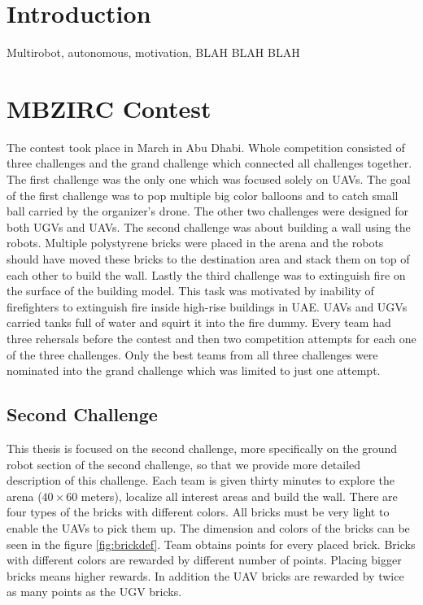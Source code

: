 \section{Introduction}
Multirobot, autonomous, motivation, BLAH BLAH BLAH


\section{MBZIRC Contest}
The contest took place in March in Abu Dhabi. Whole competition consisted of three challenges and the grand challenge which connected all challenges together. The first challenge was the only one which was focused solely on UAVs. The goal of the first challenge was to pop multiple big color balloons and to catch small ball carried by the organizer's drone. The other two challenges were designed for both UGVs and UAVs. The second challenge was about building a wall using the robots. Multiple polystyrene bricks were placed in the arena and the robots should have moved these bricks to the destination area and stack them on top of each other to build the wall. Lastly the third challenge was to extinguish fire on the surface of the building model. This task was motivated by inability of firefighters to extinguish fire inside high-rise buildings in UAE. UAVs and UGVs carried tanks full of water and squirt it into the fire dummy. Every team had three rehersals before the contest and then two competition attempts for each one of the three challenges. Only the best teams from all three challenges were nominated into the grand challenge which was limited to just one attempt.

\subsection{Second Challenge}
This thesis is focused on the second challenge, more specifically on the ground robot section of the second challenge, so that we provide more detailed description of this challenge. Each team is given thirty minutes to explore the arena ($40 \times 60$ meters), localize all interest areas and build the wall. There are four types of the bricks with different colors. All bricks must be very light to enable the UAVs to pick them up. The dimension and colors of the bricks can be seen in the figure \ref{fig:brickdef}. Team obtains points for every placed brick. Bricks with different colors are rewarded by different number of points. Placing bigger bricks means higher rewards. In addition the UAV bricks are rewarded by twice as many points as the UGV bricks.

